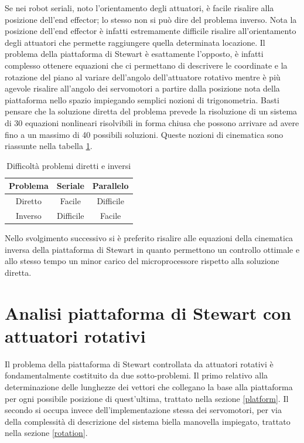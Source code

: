 \documentclass[12pt,twoside,openright]{report}
\begin{document}
Se nei robot seriali, noto l'orientamento degli attuatori, è facile risalire alla posizione dell'end effector; lo stesso non si può dire del problema inverso. Nota la posizione dell'end effector è infatti estremamente difficile risalire all'orientamento degli attuatori che permette raggiungere quella determinata locazione. Il problema della piattaforma di Stewart è esattamente l'opposto, è infatti complesso ottenere equazioni che ci permettano di descrivere le coordinate e la rotazione del piano al variare dell'angolo dell'attuatore rotativo mentre è più agevole risalire all'angolo dei servomotori a partire dalla posizione nota della piattaforma nello spazio impiegando semplici nozioni di trigonometria. Basti pensare che la soluzione diretta del problema prevede la risoluzione di un sistema di 30 equazioni nonlineari risolvibili in forma chiusa che possono arrivare ad avere fino a un massimo di 40 possibili soluzioni\cite{cinematicadiretta2}. Queste nozioni di cinematica sono riassunte nella tabella \ref{fig:tabella}.
\begin{table}[h!]
\centering
\begin{tabular}{c|cc}
   Problema     & Seriale   & Parallelo  \\ 
\hline
Diretto & Facile    & Difficile  \\
Inverso & Difficile & Facile    
\end{tabular}
\caption{Difficoltà problemi diretti e inversi} \label{fig:tabella}
\end{table}
Nello svolgimento successivo si è preferito risalire alle equazioni della cinematica inversa della piattaforma di Stewart in quanto permettono un controllo ottimale e allo stesso tempo un minor carico del microprocessore rispetto alla soluzione diretta. 



\section{Analisi piattaforma di Stewart con attuatori rotativi}\label{analisi}

Il problema della piattaforma di Stewart controllata da attuatori rotativi è fondamentalmente costituito da due sotto-problemi.
Il primo relativo alla determinazione delle lunghezze dei vettori che collegano la base alla piattaforma per ogni possibile posizione di quest'ultima, trattato nella sezione \ref{platform}. Il secondo si occupa invece dell'implementazione stessa dei servomotori, per via della complessità di descrizione del sistema biella manovella impiegato, trattato nella sezione \ref{rotation}. 
\end{document}
